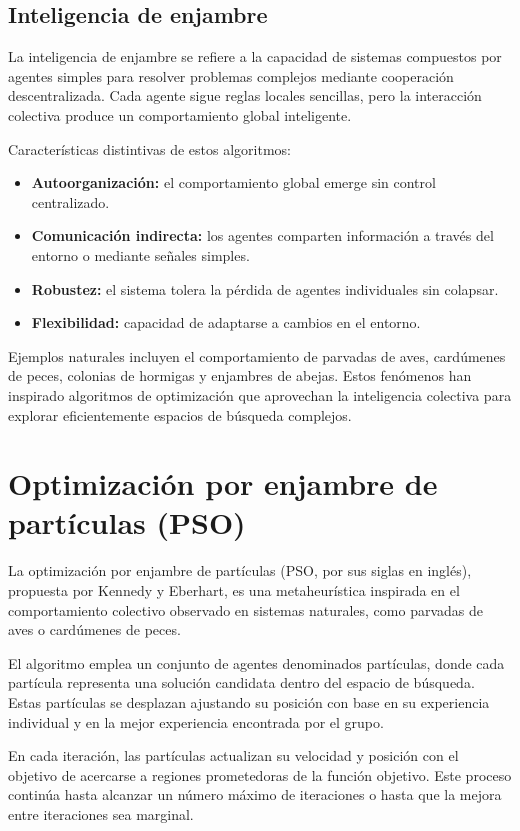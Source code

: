 \documentclass[12pt]{article}
\begin{document}
\subsection{Inteligencia de enjambre}

La inteligencia de enjambre se refiere a la capacidad de sistemas
compuestos por agentes simples para resolver problemas complejos
mediante cooperación descentralizada. Cada agente sigue reglas
locales sencillas, pero la interacción colectiva produce un
comportamiento global inteligente.

Características distintivas de estos algoritmos:

\begin{itemize}
  \item \textbf{Autoorganización:} el comportamiento global emerge
    sin control centralizado.
  \item \textbf{Comunicación indirecta:} los agentes comparten
    información a través del entorno o mediante señales simples.
  \item \textbf{Robustez:} el sistema tolera la pérdida de agentes
    individuales sin colapsar.
  \item \textbf{Flexibilidad:} capacidad de adaptarse a cambios en
    el entorno.
\end{itemize}

Ejemplos naturales incluyen el comportamiento de parvadas de aves,
cardúmenes de peces, colonias de hormigas y enjambres de abejas.
Estos fenómenos han inspirado algoritmos de optimización que
aprovechan la inteligencia colectiva para explorar eficientemente
espacios de búsqueda complejos.

\section{Optimización por enjambre de partículas (PSO)}

La optimización por enjambre de partículas (PSO, por sus siglas en
inglés), propuesta por Kennedy y Eberhart, es una metaheurística
inspirada en el comportamiento colectivo observado en sistemas
naturales, como parvadas de aves o cardúmenes de peces.

El algoritmo emplea un conjunto de agentes denominados partículas,
donde cada partícula representa una solución candidata dentro del
espacio de búsqueda. Estas partículas se desplazan ajustando su
posición con base en su experiencia individual y en la mejor
experiencia encontrada por el grupo.

En cada iteración, las partículas actualizan su velocidad y posición
con el objetivo de acercarse a regiones prometedoras de la función
objetivo. Este proceso continúa hasta alcanzar un número máximo de
iteraciones o hasta que la mejora entre iteraciones sea marginal.
\end{document}
